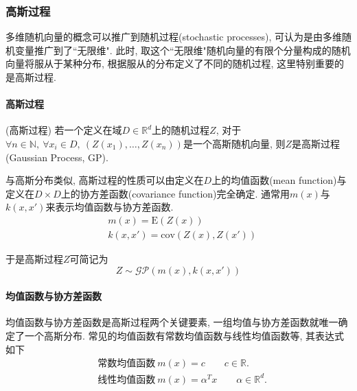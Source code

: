         
        \subsubsection{高斯过程}

            多维随机向量的概念可以推广到随机过程(stochastic processes), 可认为是由多维随机变量推广到了``无限维". 此时, 取这个``无限维"随机向量的有限个分量构成的随机向量将服从于某种分布, 根据服从的分布定义了不同的随机过程, 这里特别重要的是高斯过程.

            \paragraph{高斯过程}
                \begin{definition}(高斯过程)
                    若一个定义在域$D\in\mathds{R}^{d}$上的随机过程$Z$, 对于$\forall n\in \mathds{N},\ \forall x_{i}\in D,\ (Z(x_{1}),\dots,Z(x_{n}))$是一个高斯随机向量, 则$Z$是高斯过程(Gaussian Process, GP).
                \end{definition}

                与高斯分布类似, 高斯过程的性质可以由定义在$D$上的均值函数(mean function)与定义在$D\times D$上的协方差函数(covariance function)完全确定. 通常用$m(x)$与$k(x,x')$来表示均值函数与协方差函数. 
                \begin{align}
                    &m(x)=\mathrm{E}(Z(x)) \\
                    &k(x,x')=\mathrm{cov}(Z(x),Z(x'))
                \end{align}
                
                于是高斯过程$Z$可简记为
                \begin{equation*}
                    Z\sim\mathcal{GP}\left(m(x),k(x,x')\right)
                \end{equation*}


            \paragraph{均值函数与协方差函数}    
                均值函数与协方差函数是高斯过程两个关键要素, 一组均值与协方差函数就唯一确定了一个高斯分布. 常见的均值函数有常数均值函数与线性均值函数等, 其表达式如下\cite{Rasmussen2017}
                \begin{align}
                    &\text{常数均值函数}\ m(x)=c \qquad c\in\mathds{R}.\\
                    &\text{线性均值函数}\ m(x)=\alpha^{T}x \qquad\alpha\in\mathds{R}^{d}.
                \end{align}

